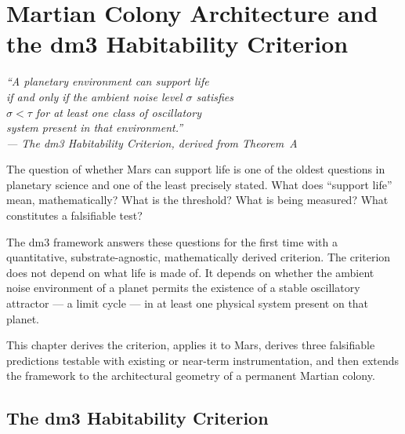 
\chapter{Martian Colony Architecture and the dm3 Habitability Criterion}
\label{ch:mars}

\begin{center}
\itshape
``A planetary environment can support life\\
if and only if the ambient noise level $\sigma$ satisfies\\
$\sigma < \tau$ for at least one class of oscillatory\\
system present in that environment.''\\[0.5em]
\normalfont\small --- The dm3 Habitability Criterion, derived from Theorem~A
\end{center}

\vspace{0.5cm}

\noindent The question of whether Mars can support life is one of the
oldest questions in planetary science and one of the least precisely
stated. What does ``support life'' mean, mathematically? What is the
threshold? What is being measured? What constitutes a falsifiable test?

The dm3 framework answers these questions for the first time with a
quantitative, substrate-agnostic, mathematically derived criterion.
The criterion does not depend on what life is made of. It depends on
whether the ambient noise environment of a planet permits the existence
of a stable oscillatory attractor --- a limit cycle --- in at least
one physical system present on that planet.

This chapter derives the criterion, applies it to Mars, derives three
falsifiable predictions testable with existing or near-term instrumentation,
and then extends the framework to the architectural geometry of a
permanent Martian colony.

\section{The dm3 Habitability Criterion}
\label{sec:mars-criterion}

